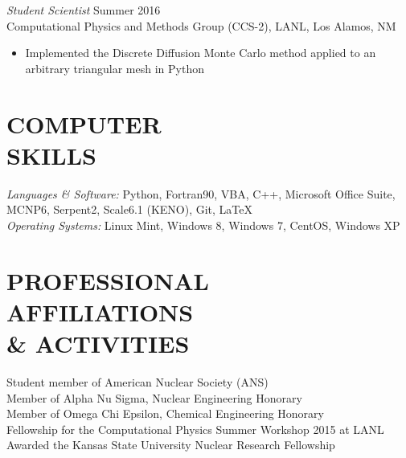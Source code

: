 \documentclass[margin, 10pt]{res} %
\begin{document}
\begin{resume}
{\sl Student Scientist} \hfill Summer 2016 \\
Computational Physics and Methods Group (CCS-2), LANL, Los Alamos, NM
\begin{itemize} 
\item Implemented the Discrete Diffusion Monte Carlo method applied to an arbitrary triangular mesh in Python
\end{itemize}

\section{COMPUTER \\ SKILLS} 

{\sl Languages \& Software:} 
Python, Fortran90, VBA, C++, Microsoft Office Suite, MCNP6, Serpent2, Scale6.1 (KENO), Git, \LaTeX  \\
{\sl Operating Systems:} Linux Mint, Windows 8, Windows 7, CentOS, Windows XP

\section{PROFESSIONAL \\ AFFILIATIONS  \\ \& ACTIVITIES} 

Student member of American Nuclear Society (ANS) \\
Member of Alpha Nu Sigma, Nuclear Engineering Honorary \\
Member of Omega Chi Epsilon, Chemical Engineering Honorary\\
Fellowship for the Computational Physics Summer Workshop 2015 at LANL\\
Awarded the Kansas State University Nuclear Research Fellowship


\end{resume}
\end{document}
